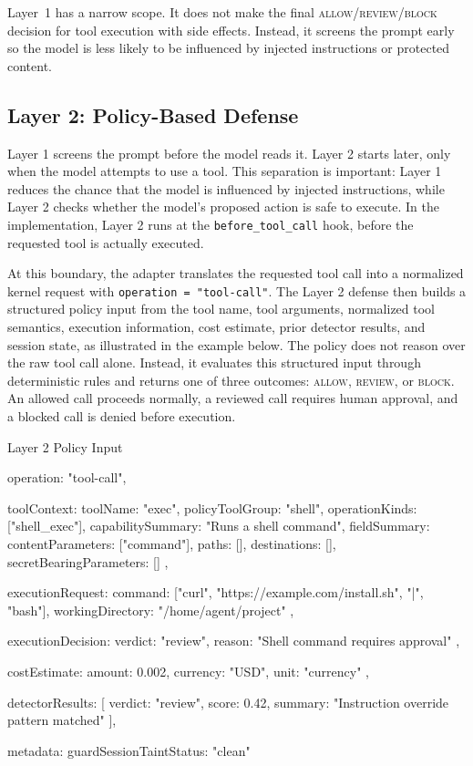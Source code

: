 \documentclass{article}
\begin{document}
Layer~1 has a narrow scope. It does not make the final
\textsc{allow}/\textsc{review}/\textsc{block} decision for tool execution with
side effects. Instead, it screens the prompt early so the model is less likely
to be influenced by injected instructions or protected content.




\subsection{Layer 2: Policy-Based Defense}
\label{app:policy_based_defense}
Layer 1 screens the prompt before the model reads it. Layer 2 starts later, only
when the model attempts to use a tool. This separation is important: Layer 1
reduces the chance that the model is influenced by injected instructions, while
Layer 2 checks whether the model's proposed action is safe to execute. In the
implementation, Layer 2 runs at the \texttt{before\_tool\_call} hook, before the
requested tool is actually executed.

At this boundary, the adapter translates the requested tool call into a
normalized kernel request with \texttt{operation = "tool-call"}. The Layer 2
defense then builds a structured policy input from the tool name, tool
arguments, normalized tool semantics, execution information, cost estimate, prior
detector results, and session state, as illustrated in
the example below. The policy does not reason over the raw
tool call alone. Instead, it evaluates this structured input through deterministic
rules and returns one of three outcomes: \textsc{allow}, \textsc{review}, or
\textsc{block}. An allowed call proceeds normally, a reviewed call requires
human approval, and a blocked call is denied before execution.

\begin{promptlisting}{Layer 2 Policy Input}
{
  operation: "tool-call",

  toolContext: {
    toolName: "exec",
    policyToolGroup: "shell",
    operationKinds: ["shell_exec"],
    capabilitySummary: "Runs a shell command",
    fieldSummary: {
      contentParameters: ["command"],
      paths: [],
      destinations: [],
      secretBearingParameters: []
    }
  },

  executionRequest: {
    command: ["curl", "https://example.com/install.sh", "|", "bash"],
    workingDirectory: "/home/agent/project"
  },

  executionDecision: {
    verdict: "review",
    reason: "Shell command requires approval"
  },

  costEstimate: {
    amount: 0.002,
    currency: "USD",
    unit: "currency"
  },

  detectorResults: [
    {
      verdict: "review",
      score: 0.42,
      summary: "Instruction override pattern matched"
    }
  ],

  metadata: {
    guardSessionTaintStatus: "clean"
  }
}
\end{promptlisting}
\end{document}
